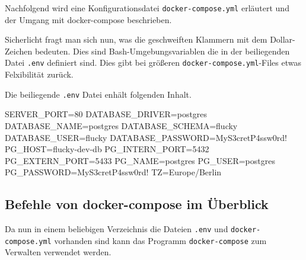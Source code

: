 Nachfolgend wird eine Konfigurationsdatei \texttt{docker-compose.yml} erläutert
und der Umgang mit docker-compose beschrieben.

\begin{landscape}
\end{landscape}

Sicherlicht fragt man sich nun, was die geschweiften Klammern mit dem
Dollar-Zeichen bedeuten. Dies sind Bash-Umgebungsvariablen die in der
beiliegenden Datei \texttt{.env} definiert sind. Dies gibt bei größeren
\texttt{docker-compose.yml}-Files etwas Felxibilität zurück.

Die beiliegende \texttt{.env} Datei enhält folgenden Inhalt.

\begin{bashcode}
  SERVER_PORT=80
  DATABASE_DRIVER=postgres
  DATABASE_NAME=postgres
  DATABASE_SCHEMA=flucky
  DATABASE_USER=flucky
  DATABASE_PASSWORD=MyS3cretP4ssw0rd!
  PG_HOST=flucky-dev-db
  PG_INTERN_PORT=5432
  PG_EXTERN_PORT=5433
  PG_NAME=postgres
  PG_USER=postgres
  PG_PASSWORD=MyS3cretP4ssw0rd!
  TZ=Europe/Berlin
\end{bashcode}

\subsection{Befehle von docker-compose im Überblick}%
\label{sec:docker-compose.befehle}

Da nun in einem beliebigen Verzeichnis die Dateien \texttt{.env} und
\texttt{docker-compose.yml} vorhanden sind kann das Programm
\texttt{docker-compose} zum Verwalten verwendet werden.

